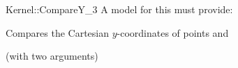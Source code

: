 \begin{ccRefFunctionObjectConcept}{Kernel::CompareY_3}
A model for this must provide:


      {Compares the Cartesian $y$-coordinates of points  and
      }

\ccRefines
{} (with two arguments)

\ccSeeAlso
{}\\

\end{ccRefFunctionObjectConcept}
